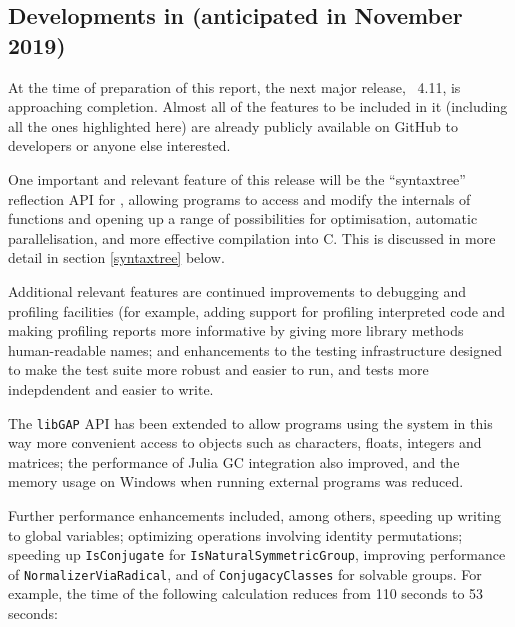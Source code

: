 \subsection{Developments in  (anticipated in November 2019)}\label{gap-4.11}



At the time of preparation of this report, the next major release,
\GAP~4.11,
is approaching completion. Almost all of the features to be
included in it (including all the ones highlighted here) are already
publicly  available on GitHub to developers or anyone else interested.

One important and relevant feature of this release will be the ``syntaxtree'' reflection
API for \GAP, allowing \GAP programs to access and modify the internals of \GAP
functions and opening up a range of possibilities for optimisation, automatic
parallelisation, and more effective compilation into C. This is
discussed in more detail in section \ref{syntaxtree} below. 

Additional relevant features are continued improvements to debugging and
profiling facilities (for example,
adding support for profiling interpreted code
and 
making profiling reports more informative by 
giving more library methods human-readable names;
and enhancements to the testing infrastructure designed to make the
test suite more robust and easier to run, and tests more indepdendent
and easier to write.

The \texttt{libGAP} API has been extended
to allow programs using the system in this way
more convenient access to \GAP objects such as
characters, floats, integers
and matrices; 
the performance of Julia GC integration also improved,
and the memory usage on Windows when running external programs was reduced.

Further performance enhancements included, among others,
speeding up writing to global variables;
optimizing operations involving identity permutations;
speeding up \verb|IsConjugate| for \verb|IsNaturalSymmetricGroup|,
improving performance of \verb|NormalizerViaRadical|,
and of \verb|ConjugacyClasses| for solvable groups. For example, the time
of the following calculation reduces from 110 seconds to 53 seconds:

